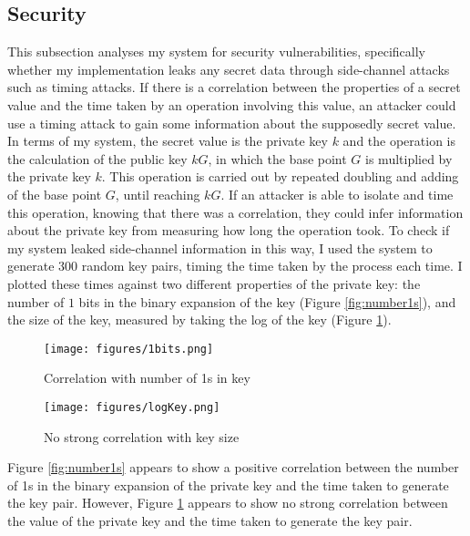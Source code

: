 \documentclass[12pt,a4paper]{article}
\begin{document}
\subsection{Security} \noindent \label{Security}
This subsection analyses my system for security vulnerabilities, 
specifically whether my implementation leaks any secret data through side-channel attacks such as timing attacks. 
If there is a correlation between the properties of a secret value and the time taken by an operation involving this value, 
an attacker could use a timing attack to gain some information about the supposedly secret value. 
In terms of my system, the secret value is the private key $k$ and the operation is the calculation of the public key $kG$, 
in which the base point $G$ is multiplied by the private key $k$. 
This operation is carried out by repeated doubling and adding of the base point $G$, until reaching $kG$. 
If an attacker is able to isolate and time this operation, knowing that there was a correlation, 
they could infer information about the private key from measuring how long the operation took. 
To check if my system leaked side-channel information in this way, 
I used the system to generate 300 random key pairs, timing the time taken by the process each time. 
I plotted these times against two different properties of the private key: 
the number of $1$ bits in the binary expansion of the key (Figure \ref{fig:number1s}), 
and the size of the key, measured by taking the log of the key (Figure \ref{fig:logkey}). 

\begin{figure}[!htb]
    \begin{minipage}{0.5\textwidth}
        \centering
        \texttt{[image: figures/1bits.png]}
        \caption{Correlation with number of 1s in key}
        \label{fig:number1s}
    \end{minipage}\hfill
    \begin{minipage}{0.5\textwidth}
        \centering
        \texttt{[image: figures/logKey.png]}
        \caption{No strong correlation with key size}
        \label{fig:logkey}
    \end{minipage}
\end{figure}

Figure \ref{fig:number1s} appears to show a positive correlation between the number of 1s in the binary expansion of the private key and the time taken to generate the key pair. 
However, Figure \ref{fig:logkey} appears to show no strong correlation between the value of the private key and the time taken to generate the key pair. 
\end{document}
